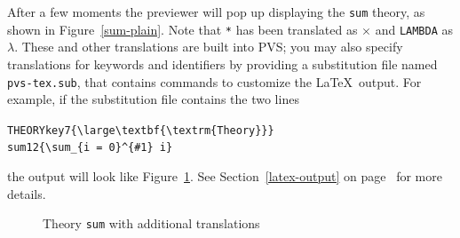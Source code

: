 After a few moments the previewer will pop up displaying the \texttt{sum}
theory, as shown in Figure~\ref{sum-plain}.  Note that \texttt{*} has been
translated as $\times$ and \texttt{LAMBDA} as $\lambda$.  These and other
translations are built into PVS; you may also specify translations for
keywords and identifiers by providing a substitution file named
\texttt{pvs-tex.sub}, that contains commands to customize the \LaTeX\
output.  For example, if the substitution file contains the two lines
{\small\small
\begin{alltt}
    THEORY key 7 \verb|{\large\textbf{\textrm{Theory}}}|
    sum    1   2 \verb|{\sum_{i = 0}^{#1} i}|
\end{alltt}}
\noindent the output will look like Figure~\ref{sum-sub}.  See
Section~\ref{latex-output} on page~\pageref{latex-output} for more
details.

\begin{figure}[t]
\begin{boxedminipage}{\textwidth}
{\small\small}
\end{boxedminipage}
\caption{Theory \texttt{sum} with additional translations}\label{sum-sub}
\end{figure}

\vspace*{1in}
